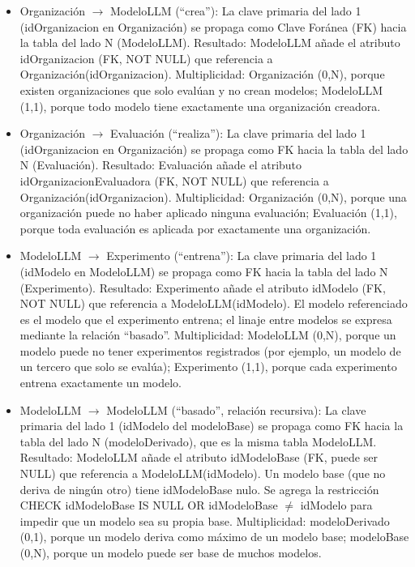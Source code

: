 \documentclass[12pt,a4paper]{article}
\begin{document}
{\sloppy\begin{itemize}
  \item Organización $\rightarrow$ ModeloLLM (``crea''): La clave primaria del lado 1 (idOrganizacion en Organización) se propaga como Clave Foránea (FK) hacia la tabla del lado N (ModeloLLM).
  Resultado: ModeloLLM añade el atributo idOrganizacion (FK, NOT NULL) que referencia a Organización(idOrganizacion).
  Multiplicidad: Organización (0,N), porque existen organizaciones que solo evalúan y no crean modelos; ModeloLLM (1,1), porque todo modelo tiene exactamente una organización creadora.

  \item Organización $\rightarrow$ Evaluación (``realiza''): La clave primaria del lado 1 (idOrganizacion en Organización) se propaga como FK hacia la tabla del lado N (Evaluación).
  Resultado: Evaluación añade el atributo idOrganizacionEvaluadora (FK, NOT NULL) que referencia a Organización(idOrganizacion).
  Multiplicidad: Organización (0,N), porque una organización puede no haber aplicado ninguna evaluación; Evaluación (1,1), porque toda evaluación es aplicada por exactamente una organización.

  \item ModeloLLM $\rightarrow$ Experimento (``entrena''): La clave primaria del lado 1 (idModelo en ModeloLLM) se propaga como FK hacia la tabla del lado N (Experimento).
  Resultado: Experimento añade el atributo idModelo (FK, NOT NULL) que referencia a ModeloLLM(idModelo). El modelo referenciado es el modelo que el experimento entrena; el linaje entre modelos se expresa mediante la relación ``basado''.
  Multiplicidad: ModeloLLM (0,N), porque un modelo puede no tener experimentos registrados (por ejemplo, un modelo de un tercero que solo se evalúa); Experimento (1,1), porque cada experimento entrena exactamente un modelo.

  \item ModeloLLM $\rightarrow$ ModeloLLM (``basado'', relación recursiva): La clave primaria del lado 1 (idModelo del modeloBase) se propaga como FK hacia la tabla del lado N (modeloDerivado), que es la misma tabla ModeloLLM.
  Resultado: ModeloLLM añade el atributo idModeloBase (FK, puede ser NULL) que referencia a ModeloLLM(idModelo). Un modelo base (que no deriva de ningún otro) tiene idModeloBase nulo. Se agrega la restricción CHECK idModeloBase IS NULL OR idModeloBase $\neq$ idModelo para impedir que un modelo sea su propia base.
  Multiplicidad: modeloDerivado (0,1), porque un modelo deriva como máximo de un modelo base; modeloBase (0,N), porque un modelo puede ser base de muchos modelos.


\end{itemize}}
\end{document}
